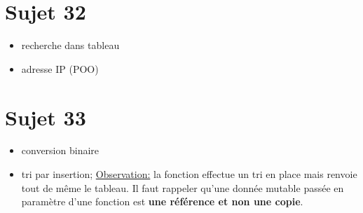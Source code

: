 \documentclass[a4paper,11pt]{article}
\begin{document}
\section{Sujet 32}
\begin{itemize}
    \item recherche dans tableau
    \item adresse IP (POO)
\end{itemize}
\section{Sujet 33}
\begin{itemize}
    \item conversion binaire
    \item tri par insertion; \underline{Observation:} la fonction effectue un tri en place mais renvoie tout de même le tableau. Il faut rappeler qu'une donnée mutable passée en paramètre d'une fonction est \textbf{une référence et non une copie}.
\end{itemize}
\end{document}
